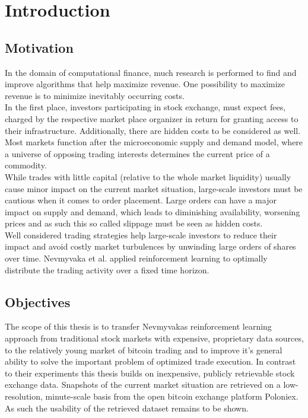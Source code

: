 \chapter{Introduction}
\label{chap:introduction}
\section{Motivation} 
\label{sec:motivation}
In the domain of computational finance, much research is performed to find and improve algorithms that help maximize revenue. One possibility to maximize revenue is to minimize inevitably occurring costs. \\

In the first place, investors participating in stock exchange, must expect fees, charged by the respective market place organizer in return for granting access to their infrastructure. Additionally, there are hidden costs to be considered as well. Most markets function after the microeconomic supply and demand \cite{todo} model, where a universe of opposing trading interests determines the current price of a commodity.\\

While trades with little capital (relative to the whole market liquidity) usually cause minor impact on the current market situation, large-scale investors must be cautious when it comes to order placement. Large orders can have a major impact on supply and demand, which leads to diminishing availability, worsening prices and as such this so called slippage must be seen as hidden costs. \\

Well considered trading strategies help large-scale investors to reduce their impact and avoid costly market turbulences by unwinding large orders of shares over time. 
Nevmyvaka et al. \cite{Nevmyvaka:2006} applied reinforcement learning to optimally distribute the trading activity over a fixed time horizon.\\

\section{Objectives}
\label{sec:objectives}
The scope of this thesis is to transfer Nevmyvakas \cite{Nevmyvaka:2006} reinforcement learning approach from traditional stock markets with expensive, proprietary data sources, to the relatively young market of bitcoin trading and to improve it's general ability to solve the important problem of optimized trade execution. In contrast to their experiments this thesis builds on inexpensive, publicly retrievable stock exchange data. Snapshots of the current market situation are retrieved on a low-resolution, minute-scale basis from the open bitcoin exchange platform Poloniex. As such the usability of the retrieved dataset remains to be shown. \\

